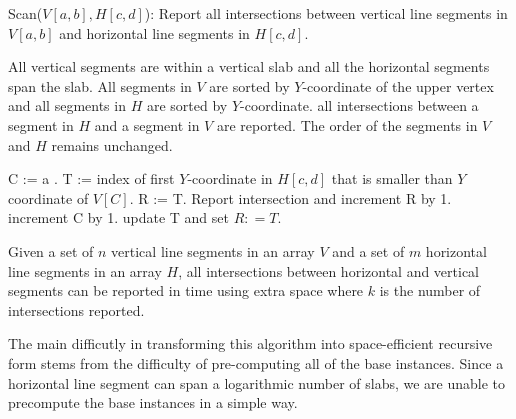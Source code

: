 \begin{algorithm}
  \caption{Scan($V[a,b],H[c,d]$): Report all intersections between vertical line segments in $V[a,b]$ and horizontal line
           segments in $H[c,d]$.} \label{alg:scan}
  \begin{algorithmic}[1]
    \REQUIRE All vertical segments are within a vertical slab and all the horizontal segments span the slab. All segments in
             $V$ are sorted by $Y$-coordinate of the upper vertex and all segments in $H$ are sorted by $Y$-coordinate.
    \ENSURE all intersections between a segment in $H$ and a segment in $V$ are reported. The order of the segments in $V$ and $H$
            remains unchanged.

\STATE C := a .
\STATE T := index of first $Y$-coordinate in $H[c,d]$ that is smaller than $Y$ coordinate of $V[C]$.
\STATE R := T.
            \STATE Report intersection and increment R by 1.
      \ENDWHILE
      \STATE increment C by 1.
      \STATE update T and set $R: = T$. 
\ENDWHILE

  \end{algorithmic}
\end{algorithm}


\begin{theorem}
Given a set of $n$ vertical line segments in an array $V$ and a set of $m$ horizontal line segments in an array $H$, all
intersections between horizontal and vertical segments can be reported in  time using  extra space where $k$ is
the number of intersections reported.
\end{theorem}

The main difficutly in transforming this algorithm into space-efficient recursive form stems from the difficulty of pre-computing
all of the base instances. Since a horizontal line segment can span a logarithmic number of slabs, we are unable
to precompute the base instances in a simple way.



